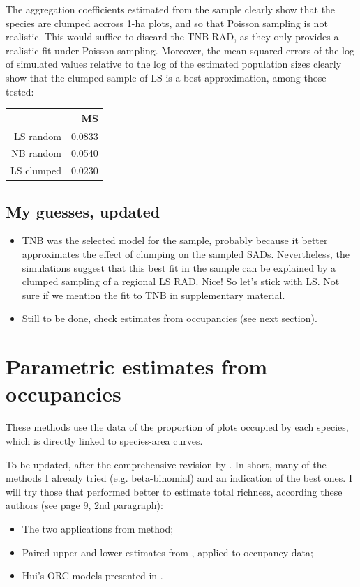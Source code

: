 \documentclass[12pt, A4]{article}\usepackage[]{graphicx}\usepackage[]{color}
\begin{document}
The aggregation coefficients estimated from the sample clearly show that
the species are clumped accross 1-ha plots, and so that
Poisson sampling is not realistic. This would suffice to
discard the TNB RAD, as they only provides a realistic fit under Poisson sampling.
Moreover, the mean-squared errors of the log of simulated values relative
to the log of the estimated population sizes clearly show that
the clumped sample of LS is a best approximation, among those tested:


\begin{table}[ht]
\centering
\begin{tabular}{rr}
  \hline
 & MS \\ 
  \hline
LS random & 0.0833 \\ 
  NB random & 0.0540 \\ 
  LS clumped & 0.0230 \\ 
   \hline
\end{tabular}
\end{table}



\subsection*{My guesses, updated}

\begin{itemize}
\item TNB was the selected model for the sample, probably because it better approximates the
  effect of clumping on the sampled SADs. Nevertheless, the simulations suggest that this best fit in the sample
  can be explained by a clumped sampling of a regional LS RAD. Nice! So let's stick with LS. Not sure if we mention the fit to TNB in supplementary material.
\item Still to be done, check estimates from occupancies (see next section).
\end{itemize}

\section{Parametric estimates from occupancies}

These methods use the data of the proportion of plots occupied by each species, which is directly linked to species-area curves.

To be updated, after the comprehensive revision by \citet{kunin2018}. In short, many of the methods I already tried 
(e.g. beta-binomial) and an indication of the best ones. I will try those that performed better to estimate total richness,
according these authors (see page 9, 2nd paragraph):

\begin{itemize}
\item The two applications from \citet{shen2008} method;
\item Paired upper and lower estimates from \citet{ulrich2005}, applied to occupancy data;
\item Hui's ORC models presented in \citet{kunin2018}.  
\end{itemize}



\end{document}
